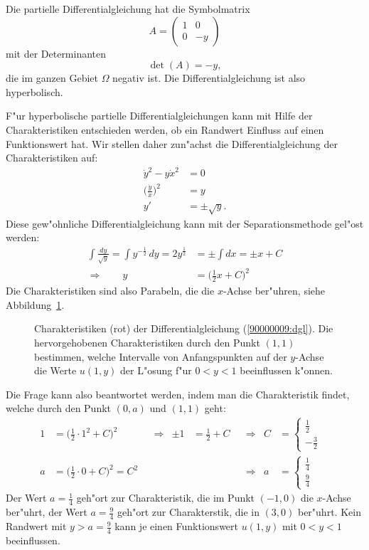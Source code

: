 \begin{loesung}
Die partielle Differentialgleichung hat die Symbolmatrix
\[
A=\begin{pmatrix}
1&0\\
0&-y
\end{pmatrix}
\]
mit der Determinanten
\[
\det(A) = -y,
\]
die im ganzen Gebiet $\Omega$ negativ ist. Die Differentialgleichung ist
also hyperbolisch.

F"ur hyperbolische partielle Differentialgleichungen kann mit Hilfe der
Charakteristiken entschieden werden, ob ein Randwert Einfluss auf einen
Funktionswert hat. Wir stellen daher zun"achst die Differentialgleichung
der Charakteristiken auf:
\begin{align*}
\dot y^2-y\dot x^2&=0\\
\biggl(\frac{\dot y}{\dot x}\biggr)^2&=y\\
y'&=\pm\sqrt{y}.
\end{align*}
Diese gew"ohnliche Differentialgleichung kann mit der Separationsmethode
gel"ost werden:
\begin{align*}
\int\frac{dy}{\sqrt{y}}
=\int y^{-\frac12}\,dy
=2y^{\frac12}
&=\pm\int dx
=\pm x+C\\
\Rightarrow\qquad
y&=\biggl(\frac12 x + C\biggr)^2
\end{align*}
Die Charakteristiken sind also Parabeln, die die $x$-Achse ber"uhren,
siehe Abbildung~\ref{90000009:domain}.
\begin{figure}
\begin{center}
\end{center}
\caption{Charakteristiken (rot) der Differentialgleichung (\ref{90000009:dgl}).
Die hervorgehobenen Charakteristiken durch den Punkt $(1,1)$ bestimmen,
welche Intervalle von Anfangspunkten auf der $y$-Achse die Werte 
$u(1,y)$ der L"osung f"ur $0<y<1$ beeinflussen k"onnen.
\label{90000009:domain}}
\end{figure}

Die Frage kann also beantwortet werden, indem man die Charakteristik
findet, welche durch den Punkt $(0,a)$ und $(1,1)$ geht:
\begin{align*}
1&=\biggl(\frac12\cdot 1^2 + C\biggr)^2&&\Rightarrow& \pm1&=\frac12 + C&&\Rightarrow& C&=\begin{cases}\frac12&\\-\frac32\end{cases}\\
a&=\biggl(\frac12\cdot 0 + C\biggr)^2=C^2&&           &     &            &&\Rightarrow& a&=\begin{cases}\frac14&\\\frac94&\end{cases}
\end{align*}
Der Wert $a=\frac14$ geh"ort zur Charakteristik, die im Punkt $(-1,0)$
die $x$-Achse ber"uhrt, der Wert $a=\frac94$ geh"ort zur Charakterstik,
die in $(3,0)$ ber"uhrt.
Kein Randwert mit $y>a=\frac94$ kann je einen Funktionswert $u(1,y)$ mit $0<y<1$
beeinflussen.
\end{loesung}

